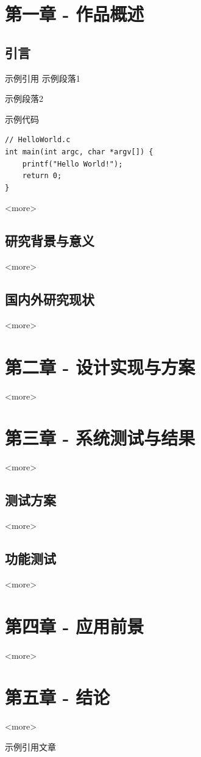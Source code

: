 \documentclass[a4paper]{article}
\begin{document}
\clearpage
\tableofcontents
\clearpage
\section{第一章 - 作品概述}
\subsection{引言}
示例引用\cite{ref1}
示例段落1\par
示例段落2\par
示例代码\par

\begin{lstlisting}
// HelloWorld.c
int main(int argc, char *argv[]) {
    printf("Hello World!");
    return 0;
}
\end{lstlisting}

<more>
\subsection{研究背景与意义}
<more>
\subsection{国内外研究现状}
<more>
\clearpage
\section{第二章 - 设计实现与方案}
<more>
\clearpage
\section{第三章 - 系统测试与结果}
<more>
\subsection{测试方案}
<more>
\subsection{功能测试}
<more>
\clearpage
\section{第四章 - 应用前景}
<more>
\clearpage
\section{第五章 - 结论}
<more>
\clearpage
\begin{thebibliography}{99}
     示例引用文章
\end{thebibliography}
\end{document}
